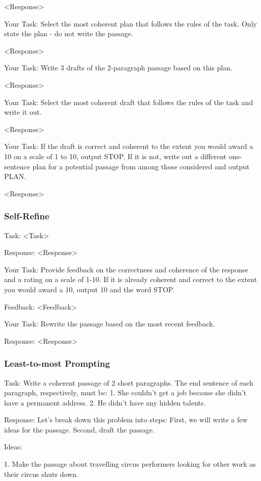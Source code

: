 \documentclass[11pt]{article}
\begin{document}
<Response>

Your Task: Select the most coherent plan that follows the rules of the task. Only state the plan - do not write the passage.

<Response>

Your Task: Write 3 drafts of the 2-paragraph passage based on this plan.

<Response>

Your Task: Select the most coherent draft that follows the rules of the task and write it out.

<Response>

Your Task: If the draft is correct and coherent to the extent you would award a 10 on a scale of 1 to 10, output STOP. If it is not, write out a different one-sentence plan for a potential passage from among those considered and output PLAN.

<Response>

\subsubsection*{Self-Refine}

Task: <Task>

Response: <Response>

Your Task: Provide feedback on the correctness and coherence of the response and a rating on a scale of 1-10. If it is already coherent and correct to the extent you would award a 10, output 10 and the word STOP.

Feedback: <Feedback>

Your Task: Rewrite the passage based on the most recent feedback.

Response: <Response>

\subsubsection*{Least-to-most Prompting}

Task: Write a coherent passage of 2 short paragraphs. The end sentence of each paragraph, respectively, must be: 1. She couldn't get a job because she didn't have a permanent address. 2. He didn't have any hidden talents.

Response: Let's break down this problem into steps: First, we will write a few ideas for the passage. Second, draft the passage.

Ideas:

1. Make the passage about travelling circus performers looking for other work as their circus shuts down.
\end{document}
